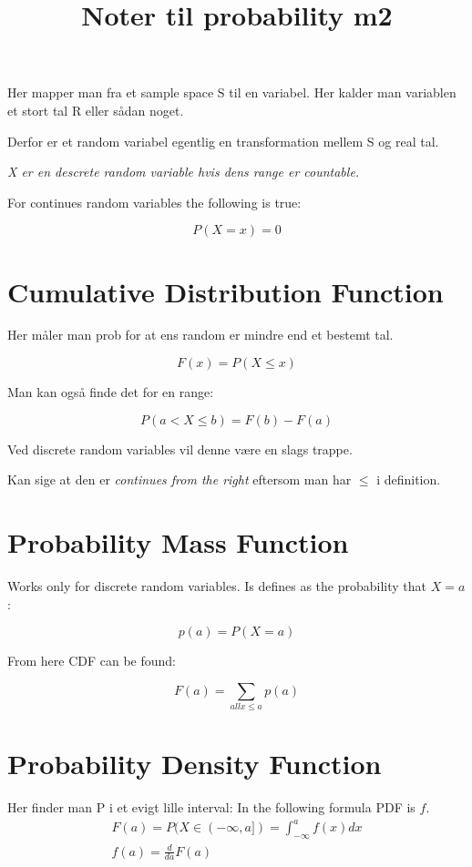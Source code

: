 \title{Noter til probability m2}

Her mapper man fra et sample space S til en variabel.
Her kalder man variablen et stort tal R eller sådan noget.

Derfor er et random variabel egentlig en transformation mellem S og real tal.

\emph{X er en descrete random variable hvis dens range er countable.}

For continues random variables the following is true:

$$
P(X = x) = 0
$$


\section{Cumulative Distribution Function}

Her måler man prob for at ens random er mindre end et bestemt tal.

$$
F(x) = P(X \leq x)
$$

Man kan også finde det for en range:

$$
P(a < X \leq b) = F(b) - F(a)
$$

Ved discrete random variables vil denne være en slags trappe.

Kan sige at den er \emph{continues from the right} eftersom man har $\leq$ i definition.

\section{Probability Mass Function}

Works only for discrete random variables.
Is defines as the probability that $X = a$:

$$
p(a) = P(X = a)
$$

From here CDF can be found:

$$
F(a) = \sum_{all x \leq a} p(a)
$$


\section{Probability Density Function}

Her finder man P i et evigt lille interval:
In the following formula PDF is $f$.
\begin{equation*}
    \begin{split}
        F(a) = P(X \in (-\infty,a]) = \int_{-\infty}^a f(x) dx \\
        f(a) = \frac{d}{da} F(a)
    \end{split}
\end{equation*}



